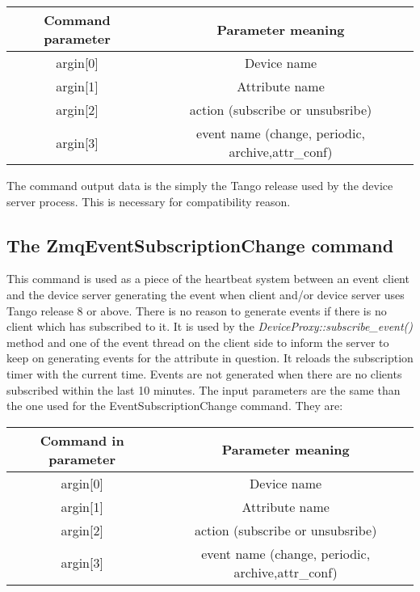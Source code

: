 \vspace{0.3cm}


\begin{center}
\begin{longtable}{|c|c|}
\hline 
Command parameter & Parameter meaning\tabularnewline
\hline 
\hline 
argin{[}0{]} & Device name\tabularnewline
\hline 
argin{[}1{]} & Attribute name\tabularnewline
\hline 
argin{[}2{]} & action (\textquotedbl{}subscribe\textquotedbl{} or \textquotedbl{}unsubsribe\textquotedbl{})\tabularnewline
\hline 
argin{[}3{]} & event name (\textquotedbl{}change\textquotedbl{}, \textquotedbl{}periodic\textquotedbl{},
\textquotedbl{}archive\textquotedbl{},\textquotedbl{}attr\_conf\textquotedbl{})\tabularnewline
\hline 
\end{longtable}
\par\end{center}

\vspace{0.3cm}


The command output data is the simply the Tango release used by the
device server process. This is necessary for compatibility reason.


\subsection{The ZmqEventSubscriptionChange
command }

This command is used as a piece of the \textquotedbl{}heartbeat\textquotedbl{}
system between an event client and the device server generating the
event when client and/or device server uses Tango release 8 or above.
There is no reason to generate events if there is no client which
has subscribed to it. It is used by the \emph{DeviceProxy::subscribe\_event()}
method and one of the event thread on the client side to inform the
server to keep on generating events for the attribute in question.
It reloads the subscription timer with the current time. Events are
not generated when there are no clients subscribed within the last
10 minutes. The input parameters are the same than the one used for
the EventSubscriptionChange command. They are:

\vspace{0.3cm}


\begin{center}
\begin{longtable}{|c|c|}
\hline 
Command in parameter & Parameter meaning\tabularnewline
\hline 
\hline 
argin{[}0{]} & Device name\tabularnewline
\hline 
argin{[}1{]} & Attribute name\tabularnewline
\hline 
argin{[}2{]} & action (\textquotedbl{}subscribe\textquotedbl{} or \textquotedbl{}unsubsribe\textquotedbl{})\tabularnewline
\hline 
argin{[}3{]} & event name (\textquotedbl{}change\textquotedbl{}, \textquotedbl{}periodic\textquotedbl{},
\textquotedbl{}archive\textquotedbl{},\textquotedbl{}attr\_conf\textquotedbl{})\tabularnewline
\hline 
\end{longtable}
\par\end{center}

